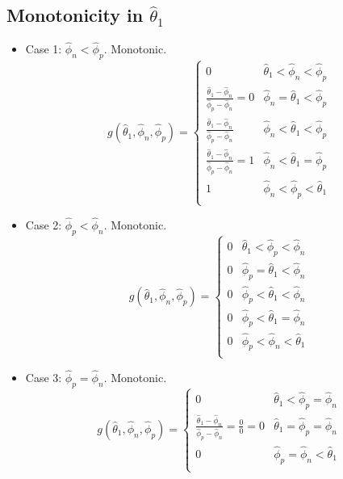 \documentclass[AMA,STIX1COL]{WileyNJD-v2}
\begin{document}
\subsection{Monotonicity in \( \hat{\theta}_1 \)}


\begin{itemize}
	\item Case 1: \( \hat{\phi}_n < \hat{\phi}_p \). Monotonic. \\
\begin{equation} 
g(\hat{\theta}_1, \hat{\phi}_n, \hat{\phi}_p)
=
\left\{ 
\begin{array}{ll}
0 & \hat{\theta}_1 < \hat{\phi}_n < \hat{\phi}_p  \\
\frac{\hat{\theta}_1 - \hat{\phi}_n}{\hat{\phi}_p - \hat{\phi}_n} = 0 & \hat{\phi}_n = \hat{\theta}_1 < \hat{\phi}_p \\
\frac{\hat{\theta}_1 - \hat{\phi}_n}{\hat{\phi}_p - \hat{\phi}_n} &	\hat{\phi}_n < \hat{\theta}_1 < \hat{\phi}_p \\
\frac{\hat{\theta}_1 - \hat{\phi}_n}{\hat{\phi}_p - \hat{\phi}_n} = 1 & \hat{\phi}_n < \hat{\theta}_1 = \hat{\phi}_p \\
1 & \hat{\phi}_n < \hat{\phi}_p < \hat{\theta}_1 \\
\end{array}
\right.
\end{equation}

\item Case 2: \( \hat{\phi}_p < \hat{\phi}_n \). Monotonic. \\
\begin{equation} 
g(\hat{\theta}_1, \hat{\phi}_n, \hat{\phi}_p)
=
\left\{ 
\begin{array}{ll}
0 & \hat{\theta}_1 < \hat{\phi}_p < \hat{\phi}_n  \\
0 & \hat{\phi}_p = \hat{\theta}_1 < \hat{\phi}_n \\
0 &	\hat{\phi}_p < \hat{\theta}_1 < \hat{\phi}_n \\
0 & \hat{\phi}_p < \hat{\theta}_1 = \hat{\phi}_n \\
0 & \hat{\phi}_p < \hat{\phi}_n < \hat{\theta}_1 \\
\end{array}
\right.
\end{equation}

\item Case 3: \( \hat{\phi}_p = \hat{\phi}_n \). Monotonic. \\
\begin{equation} 
g(\hat{\theta}_1, \hat{\phi}_n, \hat{\phi}_p)
=
\left\{ 
\begin{array}{ll}
0 & \hat{\theta}_1 < \hat{\phi}_p = \hat{\phi}_n	\\
\frac{\hat{\theta}_1 - \hat{\phi}_n}{\hat{\phi}_p - \hat{\phi}_n} = \frac{0}{0} = 0 & \hat{\theta}_1 = \hat{\phi}_p = \hat{\phi}_n 	\\
0 & \hat{\phi}_p = \hat{\phi}_n < \hat{\theta}_1	\\
\end{array}
\right.
\end{equation}
\end{itemize}
\end{document}
